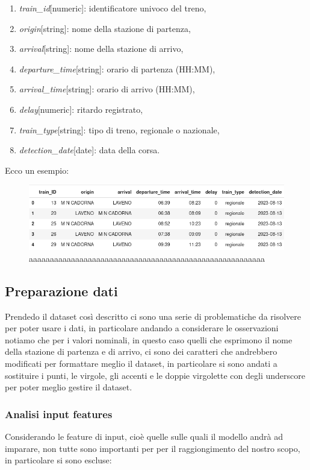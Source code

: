 \documentclass[italian,12pt,a4paper]{article}
\begin{document}
		\begin{enumerate}
			\item \textit{train\_id}[numeric]: identificatore univoco del treno,
			\item \textit{origin}[string]: nome della stazione di partenza,
			\item \textit{arrival}[string]: nome della stazione di arrivo,
			\item \textit{departure\_time}[string]: orario di partenza (HH:MM),
			\item \textit{arrival\_time}[string]: orario di arrivo (HH:MM),
			\item \textit{delay}[numeric]: ritardo registrato,
			\item \textit{train\_type}[string]: tipo di treno, regionale o nazionale,
			\item \textit{detection\_date}[date]: data della corsa.
		\end{enumerate}
		Ecco un esempio:
		
			\begin{figure}[!h]
				\centering
				\includegraphics[width=1.1\linewidth]{img/dataset}
				\caption{aaaaaaaaaaaaaaaaaaaaaaaaaaaaaaaaaaaaaaaaaaaaaaaaaaaaaaaa}
			\end{figure}
	

	\subsection{Preparazione dati}
		Prendedo il dataset così descritto ci sono una serie di problematiche da risolvere per poter usare i dati, in particolare andando a considerare le osservazioni notiamo che per i valori nominali, in questo caso quelli che esprimono il nome della stazione di partenza e di arrivo, ci sono dei caratteri che andrebbero modificati per formattare meglio il dataset, in particolare si sono andati a sostituire i punti, le virgole, gli accenti e le doppie virgolette con degli underscore per poter meglio gestire il dataset.
		
		\subsubsection{Analisi input features}
			Considerando le feature di input, cioè quelle sulle quali il modello andrà ad imparare, non tutte sono importanti per per il raggiongimento del nostro scopo, in particolare si sono escluse:
			
\end{document}
